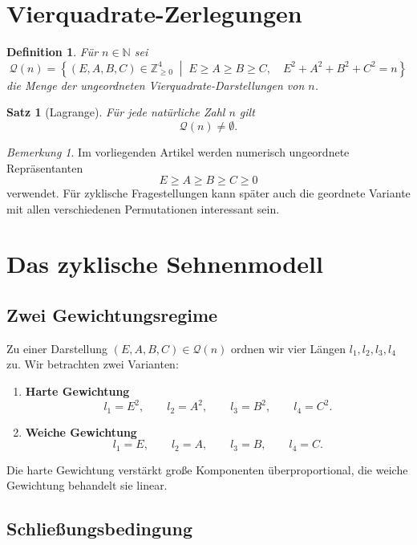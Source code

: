 \documentclass[11pt,a4paper]{article}
\newtheorem{satz}{Satz}
\newtheorem{definition}{Definition}
\theoremstyle{remark}
\newtheorem{bemerkung}{Bemerkung}
\begin{document}
	\section{Vierquadrate-Zerlegungen}
	
	\begin{definition}
		Für \(n\in\mathbb{N}\) sei
		\[
		\mathcal{Q}(n)
		=
		\left\{
		(E,A,B,C)\in\mathbb{Z}_{\ge 0}^4
		\;\middle|\;
		E\ge A\ge B\ge C,\quad
		E^2+A^2+B^2+C^2=n
		\right\}
		\]
		die Menge der ungeordneten Vierquadrate-Darstellungen von \(n\).
	\end{definition}
	
	\begin{satz}[Lagrange]
		Für jede natürliche Zahl \(n\) gilt
		\[
		\mathcal{Q}(n)\neq\emptyset.
		\]
	\end{satz}
	
	\begin{bemerkung}
		Im vorliegenden Artikel werden numerisch ungeordnete Repräsentanten
		\[
		E\ge A\ge B\ge C\ge 0
		\]
		verwendet. Für zyklische Fragestellungen kann später auch die geordnete Variante mit allen verschiedenen Permutationen interessant sein.
	\end{bemerkung}
	
	\section{Das zyklische Sehnenmodell}
	
	\subsection{Zwei Gewichtungsregime}
	
	Zu einer Darstellung \((E,A,B,C)\in\mathcal{Q}(n)\) ordnen wir vier Längen \(l_1,l_2,l_3,l_4\) zu. 
	Wir betrachten zwei Varianten:
	
	\begin{enumerate}[label=\arabic*)]
		\item \textbf{Harte Gewichtung}
		\[
		l_1=E^2,\qquad l_2=A^2,\qquad l_3=B^2,\qquad l_4=C^2.
		\]
		
		\item \textbf{Weiche Gewichtung}
		\[
		l_1=E,\qquad l_2=A,\qquad l_3=B,\qquad l_4=C.
		\]
	\end{enumerate}
	
	Die harte Gewichtung verstärkt große Komponenten überproportional, die weiche Gewichtung behandelt sie linear.
	
	\subsection{Schließungsbedingung}
	
\end{document}
